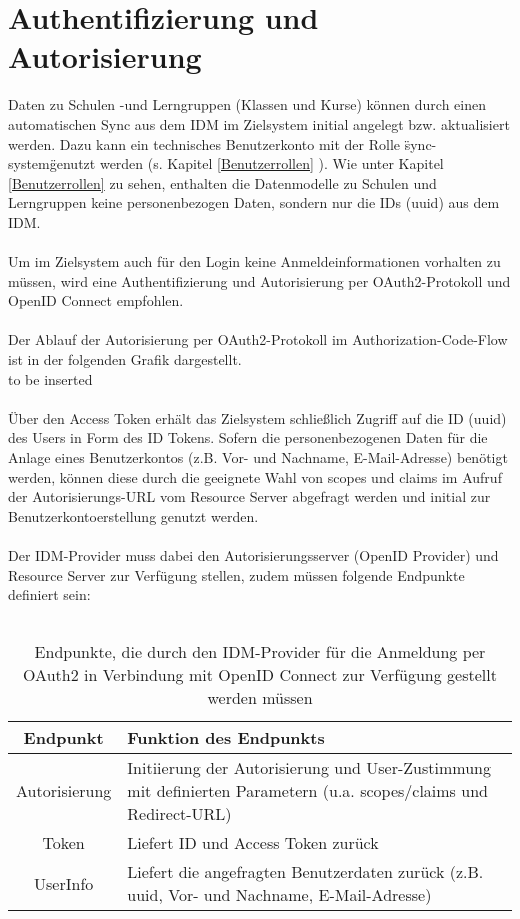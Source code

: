 \chapter{Authentifizierung und Autorisierung}
Daten zu Schulen -und Lerngruppen (Klassen und Kurse) können durch einen automatischen Sync aus dem IDM im Zielsystem initial angelegt bzw. aktualisiert werden. 
Dazu kann ein technisches Benutzerkonto mit der Rolle \"sync-system\" genutzt werden (s. Kapitel \ref{Benutzerrollen} ).
Wie unter Kapitel \ref{Benutzerrollen}  zu sehen, enthalten die Datenmodelle zu Schulen und Lerngruppen keine personenbezogen Daten, sondern nur die IDs (uuid) aus dem IDM. \\
\\
Um im Zielsystem auch für den Login keine Anmeldeinformationen vorhalten zu müssen, wird eine Authentifizierung und Autorisierung per OAuth2-Protokoll und OpenID Connect empfohlen.\\
\\
Der Ablauf der Autorisierung per OAuth2-Protokoll im Authorization-Code-Flow ist in der folgenden Grafik dargestellt. 
\\
to be inserted\\
\\
Über den Access Token erhält das Zielsystem schließlich Zugriff auf die ID (uuid) des Users in Form des ID Tokens. 
Sofern die personenbezogenen Daten für die Anlage eines Benutzerkontos (z.B. Vor- und Nachname, E-Mail-Adresse) benötigt werden, können diese durch die geeignete Wahl von scopes und claims im Aufruf der Autorisierungs-URL vom Resource Server abgefragt werden und initial zur Benutzerkontoerstellung genutzt werden.\\
\\
Der IDM-Provider muss dabei den Autorisierungsserver (OpenID Provider) und Resource Server zur Verfügung stellen, zudem müssen folgende Endpunkte definiert sein:\\
\\
\begin{table}[htb]
    \begin{tabularx}{\textwidth}{|c|X|}
        \hline
\textbf{Endpunkt} & \textbf{Funktion des Endpunkts} \\ \hline
Autorisierung & Initiierung der Autorisierung und User-Zustimmung mit definierten Parametern (u.a. scopes/claims und Redirect-URL) \\ \hline
Token & Liefert ID und Access Token zurück \\ \hline
UserInfo & Liefert die angefragten Benutzerdaten zurück (z.B. uuid, Vor- und Nachname, E-Mail-Adresse) \\ \hline
    \end{tabularx}

        \caption{Endpunkte, die durch den IDM-Provider für die Anmeldung per OAuth2 in Verbindung mit OpenID Connect zur Verfügung gestellt werden müssen}
        \label{tab:auth:endpoints}
\end{table}
